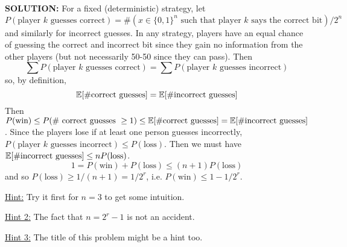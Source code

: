 \documentclass{article}
\begin{document}
\begin{enumerate}
\begin{enumerate}
\begin{shaded}
\textbf{SOLUTION:}
For a fixed (deterministic) strategy, let $P(\text{player } k \text{ guesses correct}) = \#(x \in \{0,1\}^n\text{ such that player } k \text{ says the correct bit})/2^n$ and similarly for incorrect guesses. In any strategy, players have an equal chance of guessing the correct and incorrect bit since they gain no information from the other players (but not necessarily 50-50 since they can pass). Then
\[\sum P(\text{player } k \text{ guesses correct}) = \sum P(\text{player } k \text{ guesses incorrect})\]
so, by definition,
\[\mathbb{E}[\#\text{correct guesses}] = \mathbb{E}[\#\text{incorrect guesses}]\]
Then $P(\text{win}) \leq P(\# \text{ correct guesses }\geq 1) \leq \mathbb{E}[\#\text{correct guesses}] = \mathbb{E}[\# \text{incorrect guesses}]$. Since the players lose if at least one person guesses incorrectly, $P(\text{player } k \text{ guesses incorrect}) \leq P(\text{loss})$. Then we must have $\mathbb{E}[\# \text{incorrect guesses}] \leq n P(\text{loss})$.
\[1 = P(\text{win}) + P(\text{loss}) \leq (n+1) P(\text{loss})\]
and so $P(\text{loss}) \geq 1/(n+1) = 1/2^r$, i.e. $P(\text{win}) \leq 1 - 1/2^r$.

\end{shaded}

\end{enumerate}

\underline{Hint:} Try it first for $n=3$ to get some intuition.  

\underline{Hint 2:} The fact that $n = 2^r - 1$ is not an accident.

\underline{Hint 3:} The title of this problem might be a hint too.

\end{enumerate}

\end{document}
